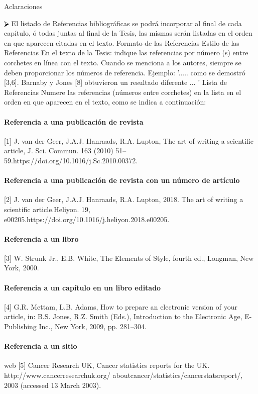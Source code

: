 Aclaraciones

⮚	El listado de Referencias bibliográficas se podrá incorporar al final de cada capítulo, ó todas juntas al final de la Tesis, las mismas serán listadas en el orden en que aparecen citadas en el texto. \newline
Formato de las Referencias\newline
Estilo de las Referencias\newline
En el texto de la Tesis: indique las referencias por número (s) entre corchetes en línea con el texto. Cuando se menciona a los autores, siempre se deben proporcionar los números de referencia.
Ejemplo: '..... como se demostró [3,6]. Barnaby y Jones [8] obtuvieron un resultado diferente ... '
Lista de Referencias\newline
Numere las referencias (números entre corchetes) en la lista en el orden en que aparecen en el texto, como se indica a continuación:
\paragraph{Referencia a una publicación de revista}
[1] J. van der Geer, J.A.J. Hanraads, R.A. Lupton, The art of writing a scientific article, J. Sci. Commun. 163 (2010) 51–59.https://doi.org/10.1016/j.Sc.2010.00372.
\paragraph{Referencia a una publicación de revista con un número de artículo}
[2] J. van der Geer, J.A.J. Hanraads, R.A. Lupton, 2018. The art of writing a scientific article.Heliyon. 19, e00205.https://doi.org/10.1016/j.heliyon.2018.e00205.
\paragraph{Referencia a un libro}
[3] W. Strunk Jr., E.B. White, The Elements of Style, fourth ed., Longman, New York, 2000.
\paragraph{Referencia a un capítulo en un libro editado}
[4] G.R. Mettam, L.B. Adams, How to prepare an electronic version of your article, in: B.S. Jones, R.Z. Smith (Eds.), Introduction to the Electronic Age, E-Publishing Inc., New York, 2009, pp. 281–304.
\paragraph{Referencia a un sitio} web
[5] Cancer Research UK, Cancer statistics reports for the UK. http://www.cancerresearchuk.org/ aboutcancer/statistics/cancerstatsreport/, 2003 (accessed 13 March 2003).
